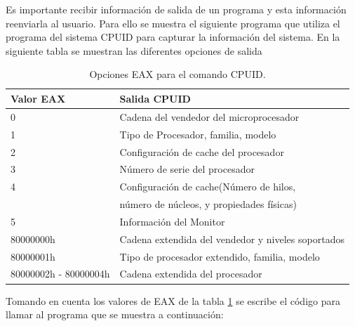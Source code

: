 \documentclass[12pt, twoside]{report}
\begin{document}
Es importante recibir información de salida de un programa y esta información reenviarla al usuario. Para ello se muestra el siguiente programa que utiliza el programa del sistema CPUID para capturar la información del sistema. En la siguiente tabla se muestran las diferentes opciones de salida 

\begin{table}[htbp]
\begin{center}
\begin{tabular}{|l|l|}
\hline
Valor EAX & Salida CPUID \\
\hline \hline
0 & Cadena del vendedor del microprocesador \\ \hline
1 & Tipo de Procesador, familia, modelo \\ \hline
2 & Configuración de cache del procesador \\ \hline
3 & Número de serie del procesador \\ \hline
4 & Configuración de cache(Número de hilos,  \\ \hline
 & número de núcleos, y propiedades físicas) \\ \hline
5 & Información del Monitor \\ \hline
80000000h & Cadena extendida del vendedor y niveles soportados \\ \hline
80000001h & Tipo de procesador extendido, familia, modelo \\ \hline
80000002h - 80000004h & Cadena extendida del procesador \\ \hline
\end{tabular}
\caption{Opciones EAX para el comando CPUID.}
\label{tabla:001}
\end{center}
\end{table}
 
 Tomando en cuenta los valores de EAX de la tabla \ref{tabla:001} se escribe el código para llamar al programa que se muestra a continuación:
 
\end{document}
